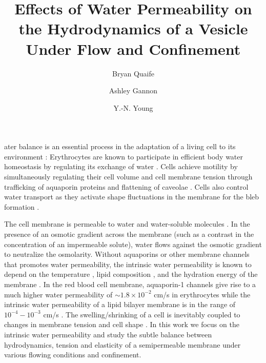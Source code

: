 \documentclass[9pt,twocolumn,twoside,lineno]{pnas-new}
\title{Effects of Water Permeability on the Hydrodynamics of a Vesicle Under Flow and Confinement}
\author[a]{Bryan Quaife}
\author[a]{Ashley Gannon}
\author[b,1]{Y.-N. Young}
\affil[a]{Department of Scientific Computing, Florida State University}
\affil[b]{Department of Mathematical Sciences, New Jersey Institute of
Technology}
\begin{document}
\maketitle
\thispagestyle{firststyle}


ater balance is an essential process in the adaptation of a living cell to its environment \cite{AlbertsMolecularBiology}: Erythrocytes are known to  participate in efficient body water homeostasis by regulating its exchange of water  \cite{YangMaVerkman2001_JBC,SugieIntaglietta2018_AmJPhysiolHCP}.  Cells achieve motility by simultaneously regulating their cell volume and cell membrane tension through trafficking of aquaporin proteins \cite{SaadounPapadopoulosWatanabeEtAl2005_JCS,Verkman2008_JMM,BerthaudEtAl2016_SM} and flattening of caveolae \cite{Keren2011_EurBJ}. 
Cells also control water transport  as they activate shape fluctuations in the membrane for the bleb formation \cite{TaloniKardashSalmanEtAl2015_PRL}.

The cell membrane is permeable to water and water-soluble molecules \cite{Dick1964_JTB,FettiplaceHaydon1980_PhysRev,DeamerBramhall1986_ChemPhysLipids,Grafmueller2019_ABLS}. In the presence of an osmotic gradient across the membrane (such as a contrast in the concentration of an impermeable solute), water flows against the osmotic gradient  to neutralize the osmolarity. Without aquaporins or other membrane channels that promotes water permeability, the intrinsic water permeability is known to depend on the temperature \cite{OlbrichRawiczNeedhamEtAl2000_BJ}, lipid composition \cite{OlbrichRawiczNeedhamEtAl2000_BJ}, and the hydration  energy of the membrane \cite{MarrinkBerendsen1994_JPhysChem}. In the red blood cell membrane, aquaporin-1 channels give rise to a much higher water permeability of $\sim 1.8\times 10^{-2}$ cm/s in erythrocytes \cite{YangMaVerkman2001_JBC} while the intrinsic water permeability of a lipid bilayer membrane is in the range of $10^{-4}-10^{-3}$ cm/s \cite{ThompsonHuang1966_ANYAS,FettiplaceHaydon1980_PhysRev,Grafmueller2019_ABLS,Dimova2020_GVB,BhatiaRobinsonDimova2020_SoftMatt}. 
%
The swelling/shrinking of a cell is inevitably coupled to changes in membrane tension and cell shape \cite{StrokaJiangChenEtAl2014_Cell,LiMoriSun2015_PRL,yao-mor2017}.  
In this work we focus on the intrinsic water permeability and study the subtle balance between hydrodynamics, tension and elasticity of a semipermeable membrane under various flowing conditions and confinement. 
\end{document}
